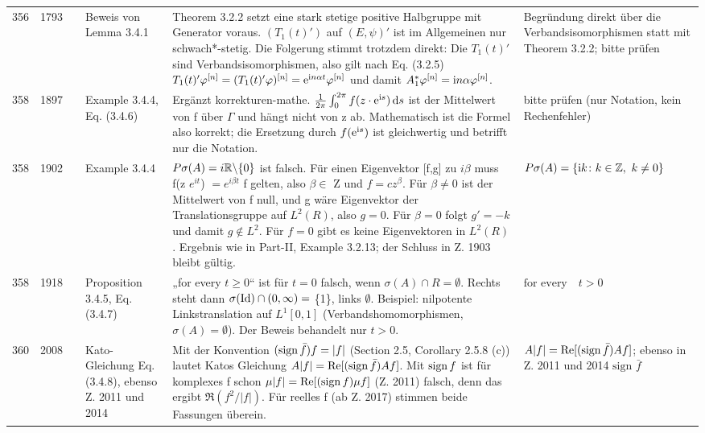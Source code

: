 \documentclass[10pt]{article}
\begin{document}
\begin{longtable}{@{}rrc>{\RaggedRight\arraybackslash}p{3.0cm}>{\RaggedRight\arraybackslash}p{11.4cm}>{\RaggedRight\arraybackslash}p{7.4cm}@{}}
356 & 1793 & \sichC{} & Beweis von Lemma 3.4.1 & Theorem 3.2.2 setzt eine stark stetige positive Halbgruppe mit Generator voraus. $(T_1(t)')$ auf $(E,\ensuremath{\psi})'$ ist im Allgemeinen nur schwach*-stetig. Die Folgerung stimmt trotzdem direkt: Die $T_1(t)'$ sind Verbandsisomorphismen, also gilt nach Eq. (3.2.5) $T_{1}(t)'\phi^{[n]} = (T_{1}(t)'\phi)^{[n]} = \eu^{\im n\alpha t}\phi^{[n]}$ und damit $A_{1}^*\phi^{[n]} = \im n\alpha\phi^{[n]}$. & Begründung direkt über die Verbandsisomorphismen statt mit Theorem 3.2.2; bitte prüfen \\[2pt]
358 & 1897 & \sichC{} & Example 3.4.4, Eq. (3.4.6) & Ergänzt korrekturen-mathe. $\frac{1}{2\pi}\int_{0}^{2\pi} f(z\cdot\eu^{\im s})\ds$ ist der Mittelwert von f über $\ensuremath{\Gamma}$ und hängt nicht von z ab. Mathematisch ist die Formel also korrekt; die Ersetzung durch $f(\eu^{\im s})$ ist gleichwertig und betrifft nur die Notation. & bitte prüfen (nur Notation, kein Rechenfehler) \\[2pt]
358 & 1902 & \sichA{} & Example 3.4.4 & $P\sigma(A) = i\R \backslash\{0\}$ ist falsch. Für einen Eigenvektor [f,g] zu $i\ensuremath{\beta}$ muss f(z $e^{it}$) $= e^{i\ensuremath{\beta}t}$ f gelten, also $\ensuremath{\beta} \ensuremath{\in}$ Z und $f = c z^\ensuremath{\beta}$. Für $\ensuremath{\beta} \ensuremath{\neq} 0$ ist der Mittelwert von f null, und g wäre Eigenvektor der Translationsgruppe auf $L^2(R)$, also $g = 0$. Für $\ensuremath{\beta} = 0$ folgt $g' = \ensuremath{-}k$ und damit $g \ensuremath{\notin} L^2$. Für $f = 0$ gibt es keine Eigenvektoren in $L^2(R)$. Ergebnis wie in Part-II, Example 3.2.13; der Schluss in Z. 1903 bleibt gültig. & $P\sigma(A) = \{\im k \colon k \in \Z,\ k \neq 0\}$ \\[2pt]
358 & 1918 & \sichB{} & Proposition 3.4.5, Eq. (3.4.7) & „for every $t \geq 0$“ ist für $t = 0$ falsch, wenn $\ensuremath{\sigma}(A) \ensuremath{\cap} R = \ensuremath{\emptyset}$. Rechts steht dann $\ensuremath{\sigma}(\Id ) \ensuremath{\cap} (0,\ensuremath{\infty}) =$ \{1\}, links $\ensuremath{\emptyset}$. Beispiel: nilpotente Linkstranslation auf $L^1[0,1]$ (Verbandshomomorphismen, $\ensuremath{\sigma}(A) = \ensuremath{\emptyset}$). Der Beweis behandelt nur $t > 0$. & $\text{for every} \quad t > 0$ \\[2pt]
360 & 2008 & \sichB{} & Kato-Gleichung Eq. (3.4.8), ebenso Z. 2011 und 2014 & Mit der Konvention $(\sign \bar{f})f = \vert f\vert$ (Section 2.5, Corollary 2.5.8 (c)) lautet Katos Gleichung $A\vert f\vert = \Re[(\sign \bar{f})Af]$. Mit $\sign f$ ist für komplexes f schon $\mu\vert f\vert = \Re[(\sign f)\mu f]$ (Z. 2011) falsch, denn das ergibt $\Re(f^2/\vert f\vert)$. Für reelles f (ab Z. 2017) stimmen beide Fassungen überein. & $A\vert f\vert = \Re [(\text{sign\,} \bar{f})Af]$; ebenso in Z. 2011 und 2014 $\text{sign } \bar{f}$ \\
\end{longtable}
\end{document}
